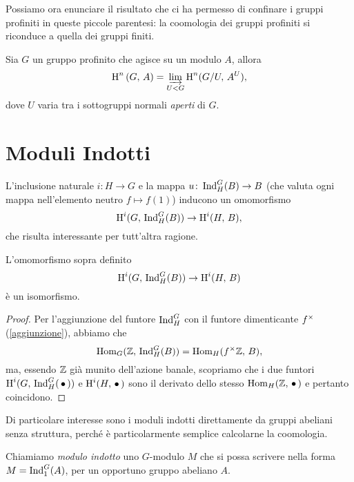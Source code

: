 \begin{profinite}
Possiamo ora enunciare il risultato che ci ha permesso di confinare i gruppi profiniti in queste piccole parentesi: la coomologia dei gruppi profiniti si riconduce a quella dei gruppi finiti.

\begin{proposition}\label{limite}
	Sia $ G $ un gruppo profinito che agisce su un modulo $ A $, allora
	\[ \operatorname{H}^n \left(G, \, A \right)  = \varinjlim_{U < G} \operatorname{H}^n(G/U, \, A^U), \]
	dove $ U $ varia tra i sottogruppi normali \emph{aperti} di $ G $.
\end{proposition}




\end{profinite}


\section{Moduli Indotti}
L'inclusione naturale $ i \colon H \to G $ e la mappa $ u \colon \operatorname{Ind}_H^G(B) \to B $ (che valuta ogni mappa nell'elemento neutro $ f \mapsto f(1) $) inducono un omomorfismo \[ \operatorname{H}^i(G, \, \operatorname{Ind}_H^G(B)) \to \operatorname{H}^i(H, \, B), \]
che risulta interessante per tutt'altra ragione.

\begin{lemma}[di Shapiro] \label{Shapiro}
	L'omomorfismo sopra definito
	\[ \operatorname{H}^i(G, \, \operatorname{Ind}_H^G(B)) \to \operatorname{H}^i(H, \, B) \]
	è un isomorfismo.
\end{lemma}
\begin{proof}
	Per l'aggiunzione del funtore $ \operatorname{Ind}_H^G $ con il funtore dimenticante $ f^\times $ (\ref{aggiunzione}), abbiamo che
	\[ \operatorname{Hom}_G(\mathbb{Z},\, \operatorname{Ind}_H^G(B)) = \operatorname{Hom}_H(f^\times \mathbb{Z}, \, B), \]
	ma, essendo $ \mathbb{Z} $ già munito dell'azione banale, scopriamo che i due funtori $ \operatorname{H}^i(G, \, \operatorname{Ind}_H^G(\,\bullet\,)) $ e $ \operatorname{H}^i(H, \, \bullet\,) $ sono il derivato dello stesso $ \operatorname{Hom}_H(\mathbb{Z}, \,\bullet \,) $ e pertanto coincidono.
\end{proof}

Di particolare interesse sono i moduli indotti direttamente da gruppi abeliani senza struttura, perché è particolarmente semplice calcolarne la coomologia.

\begin{definition}
	Chiamiamo \emph{modulo indotto} uno $ G $-modulo $ M $ che si possa scrivere nella forma $ M = \operatorname{Ind}_1^G(A) $, per un opportuno gruppo abeliano $ A $.
\end{definition}

